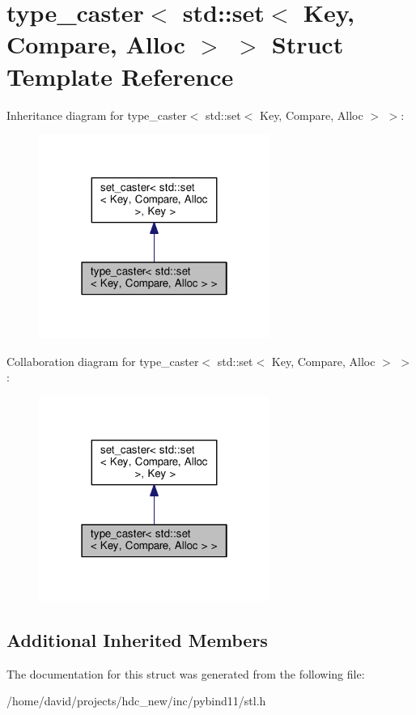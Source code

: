 \hypertarget{structtype__caster_3_01std_1_1set_3_01_key_00_01_compare_00_01_alloc_01_4_01_4}{}\section{type\+\_\+caster$<$ std\+:\+:set$<$ Key, Compare, Alloc $>$ $>$ Struct Template Reference}
\label{structtype__caster_3_01std_1_1set_3_01_key_00_01_compare_00_01_alloc_01_4_01_4}


Inheritance diagram for type\+\_\+caster$<$ std\+:\+:set$<$ Key, Compare, Alloc $>$ $>$\+:
\nopagebreak
\begin{figure}[H]
\begin{center}
\leavevmode
\includegraphics[width=214pt]{structtype__caster_3_01std_1_1set_3_01_key_00_01_compare_00_01_alloc_01_4_01_4__inherit__graph}
\end{center}
\end{figure}


Collaboration diagram for type\+\_\+caster$<$ std\+:\+:set$<$ Key, Compare, Alloc $>$ $>$\+:
\nopagebreak
\begin{figure}[H]
\begin{center}
\leavevmode
\includegraphics[width=214pt]{structtype__caster_3_01std_1_1set_3_01_key_00_01_compare_00_01_alloc_01_4_01_4__coll__graph}
\end{center}
\end{figure}
\subsection*{Additional Inherited Members}


The documentation for this struct was generated from the following file\+:\begin{DoxyCompactItemize}
\item 
/home/david/projects/hdc\+\_\+new/inc/pybind11/stl.\+h\end{DoxyCompactItemize}
